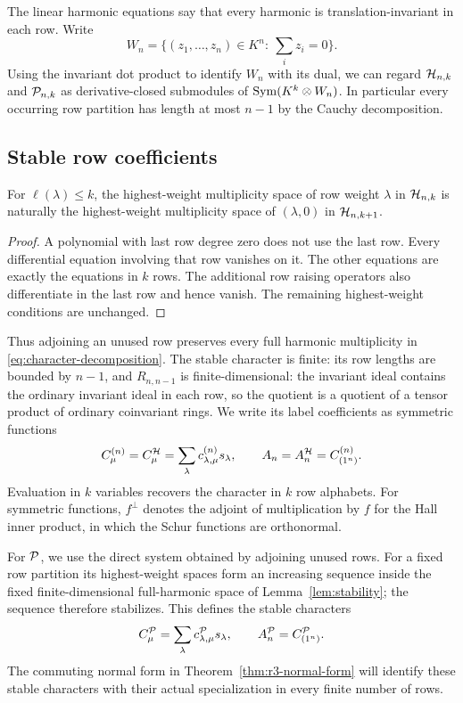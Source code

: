 The linear harmonic equations say that every harmonic is
translation-invariant in each row.  Write
\[
 W_n=\{(z_1,\ldots,z_n)\in K^n:\ \textstyle\sum_i z_i=0\}.
\]
Using the invariant dot product to identify $W_n$ with its
dual, we can regard $\mathcal H_{n,k}$ and $\mathcal P_{n,k}$ as
derivative-closed submodules of $\operatorname{Sym}(K^k\otimes W_n)$.
In particular every occurring row partition has length at
most $n-1$ by the Cauchy decomposition.

\subsection{Stable row coefficients}

\begin{lemma}\label{lem:stability}
For $\ell(\lambda)\leq k$, the highest-weight multiplicity
space of row weight $\lambda$ in $\mathcal H_{n,k}$ is naturally
the highest-weight multiplicity space of
$(\lambda,0)$ in $\mathcal H_{n,k+1}$.
\end{lemma}

\begin{proof}
A polynomial with last row degree zero does not use the last
row.  Every differential equation involving that row vanishes
on it.  The other equations are exactly the equations in
$k$ rows.  The additional row raising operators also differentiate
in the last row and hence vanish.  The remaining highest-weight
conditions are unchanged.
\end{proof}

Thus adjoining an unused row preserves every full harmonic
multiplicity in \eqref{eq:character-decomposition}.  The stable
character is finite: its row lengths
are bounded by $n-1$, and $R_{n,n-1}$ is finite-dimensional:
the invariant ideal contains the ordinary invariant ideal in
each row, so the quotient is a quotient of a tensor product
of ordinary coinvariant rings.
We write its label coefficients as symmetric functions
\[
 C_\mu^{(n)}=C_\mu^\mathcal H
       =\sum_\lambda c_{\lambda,\mu}^{(n)}s_\lambda,
 \qquad A_n=A_n^\mathcal H=C_{(1^n)}^{(n)}.
\]
Evaluation in $k$ variables recovers the character in $k$ row
alphabets.  For symmetric functions, $f^\perp$ denotes the
adjoint of multiplication by $f$ for the Hall inner product, in
which the Schur functions are orthonormal.

For $\mathcal P$, we use the direct system obtained by adjoining unused
rows.  For a fixed row partition its highest-weight spaces form
an increasing sequence inside the fixed finite-dimensional
full-harmonic space of Lemma~\ref{lem:stability}; the sequence
therefore stabilizes.  This defines the stable characters
\[
 C_\mu^{\mathcal P}=\sum_\lambda c_{\lambda,\mu}^{\mathcal P}s_\lambda,
 \qquad A_n^{\mathcal P}=C_{(1^n)}^{\mathcal P}.
\]
The commuting normal form in
Theorem~\ref{thm:r3-normal-form} will identify these stable
characters with their actual specialization in every finite
number of rows.

